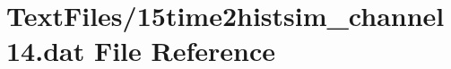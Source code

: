 \hypertarget{15time2histsim__channel14_8dat}{}\section{Text\+Files/15time2histsim\+\_\+channel14.dat File Reference}
\label{15time2histsim__channel14_8dat}
